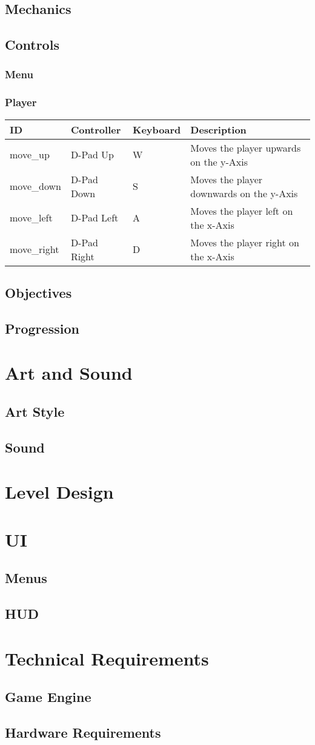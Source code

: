 \documentclass[pdftex,12pt,a4paper,ngerman,dvipsnames]{scrreport}
\begin{document}
\section{Mechanics}
\section{Controls}
\subsection{Menu}
\subsection{Player}
\begin{tabular}{l|l|l|l}
  ID & Controller & Keyboard & Description \\ \hline
  move\_up & D-Pad Up & W & Moves the player upwards on the y-Axis \\
  move\_down & D-Pad Down & S & Moves the player downwards on the y-Axis \\
  move\_left & D-Pad Left & A & Moves the player left on the x-Axis \\
  move\_right & D-Pad Right & D & Moves the player right on the x-Axis \\
\end{tabular}
\section{Objectives}
\section{Progression}
\chapter{Art and Sound}
\section{Art Style}
\section{Sound}
\chapter{Level Design}
\chapter{UI}
\section{Menus}
\section{HUD}
\chapter{Technical Requirements}
\section{Game Engine}
\section{Hardware Requirements}
\end{document}
